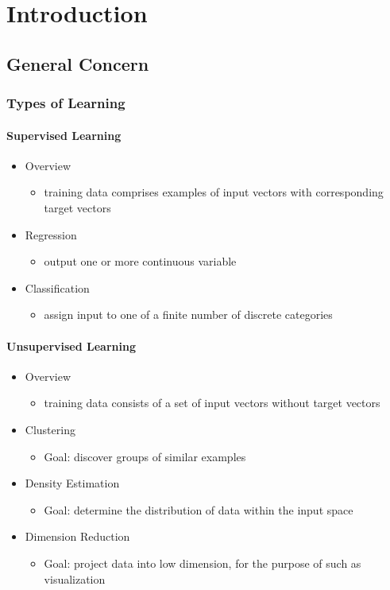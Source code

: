 \chapter{Introduction}

\section{General Concern}
\subsection{Types of Learning}

\subsubsection{Supervised Learning}
\begin{itemize}
\item Overview
	\begin{itemize}
	\item training data comprises examples of input vectors with corresponding target vectors
	\end{itemize}
\item Regression
	\begin{itemize}
	\item output one or more continuous variable
	\end{itemize}
\item Classification
	\begin{itemize}
	\item assign input to one of a finite number of discrete categories
	\end{itemize}
\end{itemize}

\subsubsection{Unsupervised Learning}
\begin{itemize}
\item Overview
	\begin{itemize}
	\item training data consists of a set of input
	vectors without target vectors
	\end{itemize}
\item Clustering
	\begin{itemize}
	\item Goal: discover groups of similar examples
	\end{itemize}
\item Density Estimation
	\begin{itemize}
	\item Goal: determine the distribution of data within the input space
	\end{itemize}
\item Dimension Reduction
	\begin{itemize}
	\item Goal: project data into low dimension, for the purpose of such as visualization
	\end{itemize}
\end{itemize}

